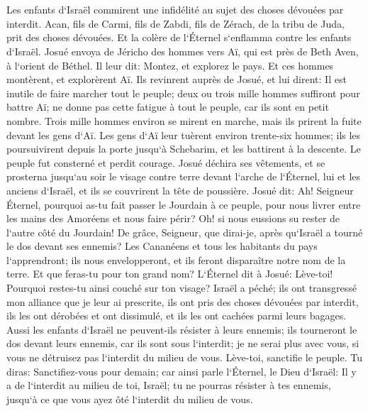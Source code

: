 \chapter{}

\verse Les enfants d`Israël commirent une infidélité au sujet des choses dévouées par interdit. Acan, fils de Carmi, fils de Zabdi, fils de Zérach, de la tribu de Juda, prit des choses dévouées. Et la colère de l`Éternel s`enflamma contre les enfants d`Israël. 
\verse Josué envoya de Jéricho des hommes vers Aï, qui est près de Beth Aven, à l`orient de Béthel. Il leur dit: Montez, et explorez le pays. Et ces hommes montèrent, et explorèrent Aï. 
\verse Ils revinrent auprès de Josué, et lui dirent: Il est inutile de faire marcher tout le peuple; deux ou trois mille hommes suffiront pour battre Aï; ne donne pas cette fatigue à tout le peuple, car ils sont en petit nombre. 
\verse Trois mille hommes environ se mirent en marche, mais ils prirent la fuite devant les gens d`Aï. 
\verse Les gens d`Aï leur tuèrent environ trente-six hommes; ils les poursuivirent depuis la porte jusqu`à Schebarim, et les battirent à la descente. Le peuple fut consterné et perdit courage. 
\verse Josué déchira ses vêtements, et se prosterna jusqu`au soir le visage contre terre devant l`arche de l`Éternel, lui et les anciens d`Israël, et ils se couvrirent la tête de poussière. 
\verse Josué dit: Ah! Seigneur Éternel, pourquoi as-tu fait passer le Jourdain à ce peuple, pour nous livrer entre les mains des Amoréens et nous faire périr? Oh! si nous eussions su rester de l`autre côté du Jourdain! 
\verse De grâce, Seigneur, que dirai-je, après qu`Israël a tourné le dos devant ses ennemis? 
\verse Les Cananéens et tous les habitants du pays l`apprendront; ils nous envelopperont, et ils feront disparaître notre nom de la terre. Et que feras-tu pour ton grand nom? 
\verse L`Éternel dit à Josué: Lève-toi! Pourquoi restes-tu ainsi couché sur ton visage? 
\verse Israël a péché; ils ont transgressé mon alliance que je leur ai prescrite, ils ont pris des choses dévouées par interdit, ils les ont dérobées et ont dissimulé, et ils les ont cachées parmi leurs bagages. 
\verse Aussi les enfants d`Israël ne peuvent-ils résister à leurs ennemis; ils tourneront le dos devant leurs ennemis, car ils sont sous l`interdit; je ne serai plus avec vous, si vous ne détruisez pas l`interdit du milieu de vous. 
\verse Lève-toi, sanctifie le peuple. Tu diras: Sanctifiez-vous pour demain; car ainsi parle l`Éternel, le Dieu d`Israël: Il y a de l`interdit au milieu de toi, Israël; tu ne pourras résister à tes ennemis, jusqu`à ce que vous ayez ôté l`interdit du milieu de vous. 
